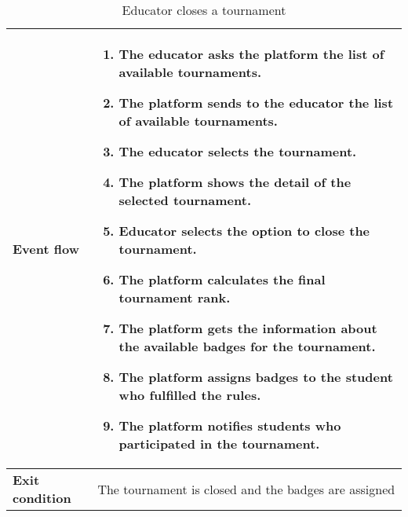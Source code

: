 \begin{enumerate}[label=\textbf{UC\arabic*}:,ref=UC\arabic*,leftmargin=1.3cm]
{\begin{table}[H]
\begin{tabular}{|l|p{11.9cm}|}
                        \textbf{Event flow}      &
                        \begin{enumerate}[label=\arabic*.]
                              \item The educator asks the platform the list of available tournaments.
                              \item The platform sends to the educator the list of available tournaments.
                              \item The educator selects the tournament.
                              \item The platform shows the detail of the selected tournament.
                              \item Educator selects the option to close the tournament.
                              \item The platform calculates the final tournament rank.
                              \item The platform gets the information about the available badges for the tournament.
                              \item The platform assigns badges to the student who fulfilled the rules.
                              \item The platform notifies students who participated in the tournament.
                        \end{enumerate} \\\hline
                        \textbf{Exit condition}  & The tournament is closed and the badges are assigned       \\\hline
                  \end{tabular}
                  \caption{Educator closes a tournament   }
                  \label{table:Educator closes a tournament   }
            \end{table}
            \begin{adjustbox}{
                        max size={\textwidth}{},
                        caption={Educator closes a tournament},
                        label={fig:Educator closes a tournament},
                        figure=H}
                  \centering
            \end{adjustbox}
      }
\end{enumerate}
\pagebreak

